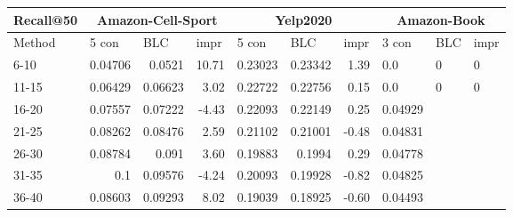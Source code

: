\begin{table}[]%
    \centering
    \begin{tabular}{|l|r|r|r||r|r|r||l|l|l|}
        \hline
        Recall@50 & \multicolumn{3}{c||}{Amazon-Cell-Sport} & \multicolumn{3}{c|}{Yelp2020} & \multicolumn{3}{c|}{Amazon-Book}                                                                                                             \\ \hline
        Method    & \multicolumn{1}{l|}{5 con}              & \multicolumn{1}{l|}{BLC}      & \multicolumn{1}{l||}{impr}       & \multicolumn{1}{l|}{5 con} & \multicolumn{1}{l|}{BLC} & \multicolumn{1}{l||}{impr} & 3 con   & BLC & impr \\ \hline
        6-10      & 0.04706                                 & 0.0521                        & 10.71                            & 0.23023                    & 0.23342                  & 1.39                       & 0.0     & 0   & 0    \\ \hline
        11-15     & 0.06429                                 & 0.06623                       & 3.02                             & 0.22722                    & 0.22756                  & 0.15                       & 0.0     & 0   & 0    \\ \hline
        16-20     & 0.07557                                 & 0.07222                       & -4.43                            & 0.22093                    & 0.22149                  & 0.25                       & 0.04929 &     &      \\ \hline
        21-25     & 0.08262                                 & 0.08476                       & 2.59                             & 0.21102                    & 0.21001                  & -0.48                      & 0.04831 &     &      \\ \hline
        26-30     & 0.08784                                 & 0.091                         & 3.60                             & 0.19883                    & 0.1994                   & 0.29                       & 0.04778 &     &      \\ \hline
        31-35     & 0.1                                     & 0.09576                       & -4.24                            & 0.20093                    & 0.19928                  & -0.82                      & 0.04825 &     &      \\ \hline
        36-40     & 0.08603                                 & 0.09293                       & 8.02                             & 0.19039                    & 0.18925                  & -0.60                      & 0.04493 &     &      \\ \hline

\end{tabular}
\end{table}
